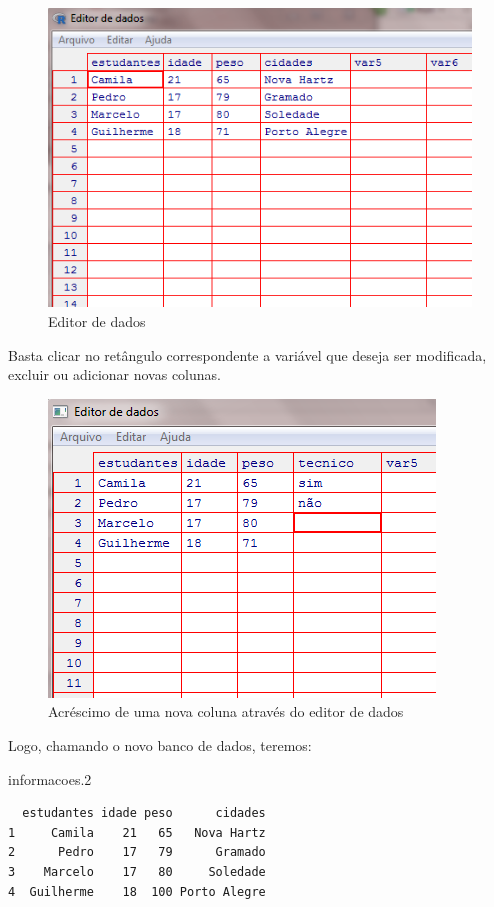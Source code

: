 \documentclass[12pt,brazil,]{book}
\newenvironment{Shaded}{\begin{snugshade}}{\end{snugshade}}
\newcommand{\FloatTok}[1]{\textcolor[rgb]{0.00,0.00,0.81}{#1}}
\newcommand{\NormalTok}[1]{#1}
\begin{document}
\begin{figure}

{\centering \includegraphics[width=0.6\linewidth]{95} 

}

\caption{Editor de dados}\label{fig:95}
\end{figure}

Basta clicar no retângulo correspondente a variável que deseja ser
modificada, excluir ou adicionar novas colunas.

\begin{figure}

{\centering \includegraphics[width=0.6\linewidth]{10} 

}

\caption{Acréscimo de uma nova coluna através do editor de dados}\label{fig:10}
\end{figure}

Logo, chamando o novo banco de dados, teremos:

\begin{Shaded}
\begin{Highlighting}[]
\NormalTok{informacoes}\FloatTok{.2} 
\end{Highlighting}
\end{Shaded}

\begin{verbatim}
  estudantes idade peso      cidades
1     Camila    21   65   Nova Hartz
2      Pedro    17   79      Gramado
3    Marcelo    17   80     Soledade
4  Guilherme    18  100 Porto Alegre
\end{verbatim}
\end{document}
